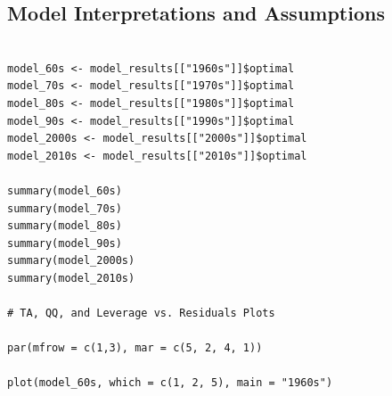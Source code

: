 \documentclass[11pt]{article}
\begin{document}
\subsection{Model Interpretations and Assumptions}
\begin{verbatim}

model_60s <- model_results[["1960s"]]$optimal
model_70s <- model_results[["1970s"]]$optimal
model_80s <- model_results[["1980s"]]$optimal
model_90s <- model_results[["1990s"]]$optimal
model_2000s <- model_results[["2000s"]]$optimal
model_2010s <- model_results[["2010s"]]$optimal

summary(model_60s)
summary(model_70s)
summary(model_80s)
summary(model_90s)
summary(model_2000s)
summary(model_2010s)

# TA, QQ, and Leverage vs. Residuals Plots

par(mfrow = c(1,3), mar = c(5, 2, 4, 1))

plot(model_60s, which = c(1, 2, 5), main = "1960s")

\end{verbatim}
\end{document}
